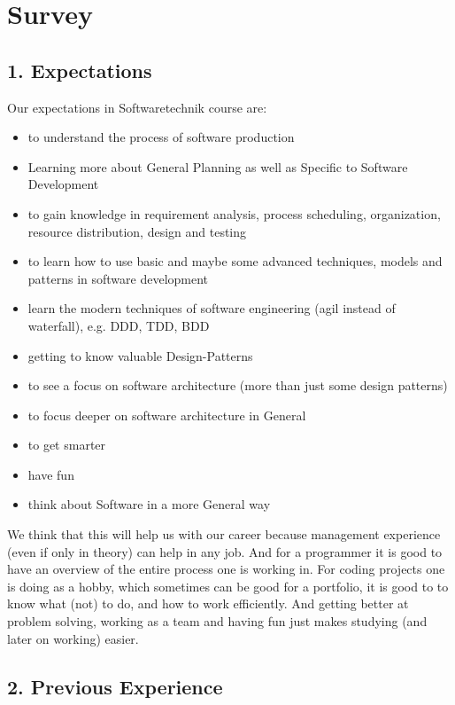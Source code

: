 \documentclass{scrartcl}
\begin{document}
\section*{Survey}

\subsection*{1. Expectations}
Our expectations in Softwaretechnik course are:
\begin{itemize}
\item to understand the process of software production
\item Learning more about General Planning as well as
Specific to Software Development
\item to gain knowledge in requirement analysis, process scheduling,
organization, resource distribution, design and testing
\item to learn how to use basic and maybe some advanced techniques,
models and patterns in software development
\item learn the modern techniques of software engineering (agil instead of waterfall), e.g. DDD, TDD, BDD
\item getting to know valuable Design-Patterns
\item to see a focus on software architecture (more than just some design patterns)
\item to focus deeper on software architecture in General
\item to get smarter
\item have fun
\item think about Software in a more General way
\end{itemize}

We think that this will help us with our career because management experience (even if only in theory) can help in any job. And for a programmer it is good to have an overview of the entire process one is working in. For coding projects one is doing as a hobby, which sometimes can be good for a portfolio, it is good to to know what (not) to do, and how to work efficiently. And getting better at problem solving, working as a team and having fun just makes studying (and later on working) easier.

\subsection*{2. Previous Experience}
\end{document}
